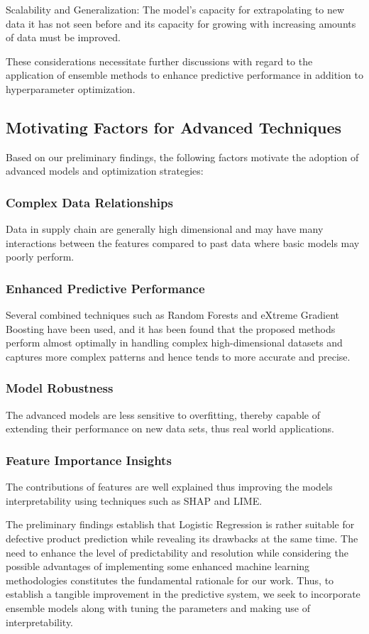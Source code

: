\documentclass[conference]{IEEEtran}
\begin{document}
Scalability and Generalization: The model’s capacity for extrapolating to new data it has not seen before and its capacity for growing with increasing amounts of data must be improved.

These considerations necessitate further discussions with regard to the application of ensemble methods to enhance predictive performance in addition to hyperparameter optimization.

\subsection{Motivating Factors for Advanced Techniques}

Based on our preliminary findings, the following factors motivate the adoption of advanced models and optimization strategies:

\subsubsection{Complex Data Relationships}
Data in supply chain are generally high dimensional and may have many interactions between the features compared to past data where basic models may poorly perform.

\subsubsection{Enhanced Predictive Performance}
Several combined techniques such as Random Forests and eXtreme Gradient Boosting have been used, and it has been found that the proposed methods perform almost optimally in handling complex high-dimensional datasets and captures more complex patterns and hence tends to more accurate and precise.

\subsubsection{Model Robustness}
The advanced models are less sensitive to overfitting, thereby capable of extending their performance on new data sets, thus real world applications.

\subsubsection{Feature Importance Insights}
The contributions of features are well explained thus improving the models interpretability using techniques such as SHAP and LIME.

The preliminary findings establish that Logistic Regression is rather suitable for defective product prediction while revealing its drawbacks at the same time. The need to enhance the level of predictability and resolution while considering the possible advantages of implementing some enhanced machine learning methodologies constitutes the fundamental rationale for our work. Thus, to establish a tangible improvement in the predictive system, we seek to incorporate ensemble models along with tuning the parameters and making use of interpretability.
\end{document}
